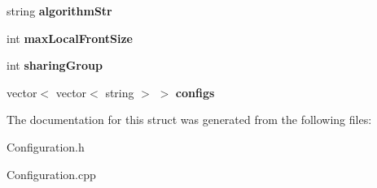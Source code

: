 \begin{DoxyCompactItemize}
\mbox{\label{structTAlgorithm_a09f6e37f7bb6931e00854e4a5c91ce18}} 
string {\bfseries algorithm\+Str}
\item 
\mbox{\label{structTAlgorithm_a032830222864fa6c1561eab22fbd2866}} 
int {\bfseries max\+Local\+Front\+Size}
\item 
\mbox{\label{structTAlgorithm_a48920240df5788dfbba6c5f86cf83801}} 
int {\bfseries sharing\+Group}
\item 
\mbox{\label{structTAlgorithm_addf7831c7bc5c5224b0e08d3f529eadb}} 
vector$<$ vector$<$ string $>$ $>$ {\bfseries configs}
\end{DoxyCompactItemize}


The documentation for this struct was generated from the following files\+:\begin{DoxyCompactItemize}
\item 
Configuration.\+h\item 
Configuration.\+cpp\end{DoxyCompactItemize}
